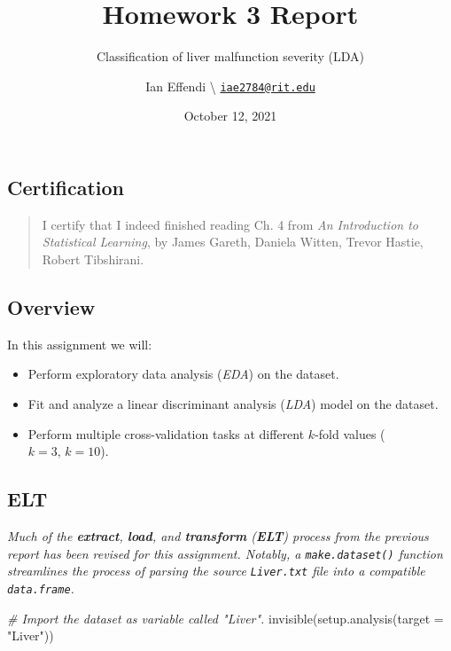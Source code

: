 \documentclass[
  11pt,
  a4paper,
]{scrartcl}
\title{Homework 3 Report}
\subtitle{Classification of liver malfunction severity (LDA)}
\author{Ian Effendi \textbackslash{}
\href{mailto:iae2784@rit.edu}{\nolinkurl{iae2784@rit.edu}}}
\date{October 12, 2021}
\newenvironment{Shaded}{\begin{snugshade}}{\end{snugshade}}
\newcommand{\AttributeTok}[1]{\textcolor[rgb]{0.77,0.63,0.00}{#1}}
\newcommand{\CommentTok}[1]{\textcolor[rgb]{0.56,0.35,0.01}{\textit{#1}}}
\newcommand{\FunctionTok}[1]{\textcolor[rgb]{0.00,0.00,0.00}{#1}}
\newcommand{\NormalTok}[1]{#1}
\newcommand{\StringTok}[1]{\textcolor[rgb]{0.31,0.60,0.02}{#1}}
\providecommand{\tightlist}{%
  \setlength{\itemsep}{0pt}\setlength{\parskip}{0pt}}
\begin{document}
\maketitle

{
\hypersetup{linkcolor=blue}
\setcounter{tocdepth}{3}
\tableofcontents
}
\hypertarget{certification}{%
\subsection{Certification}\label{certification}}

\begin{quote}
I certify that I indeed finished reading Ch. 4 from \emph{An
Introduction to Statistical Learning}, by James Gareth, Daniela Witten,
Trevor Hastie, Robert Tibshirani.
\end{quote}

\hypertarget{overview}{%
\subsection{Overview}\label{overview}}

In this assignment we will:

\begin{itemize}
\tightlist
\item
  Perform exploratory data analysis (\emph{EDA}) on the dataset.
\item
  Fit and analyze a linear discriminant analysis (\emph{LDA}) model on
  the dataset.
\item
  Perform multiple cross-validation tasks at different \(k\)-fold values
  (\(k=3,\,k=10\)).
\end{itemize}

\hypertarget{elt}{%
\subsection{ELT}\label{elt}}

\emph{Much of the \textbf{extract}, \textbf{load}, and
\textbf{transform} (\textbf{ELT}) process from the previous report has
been revised for this assignment. Notably, a \texttt{make.dataset()}
function streamlines the process of parsing the source
\texttt{Liver.txt} file into a compatible \texttt{data.frame}.}

\begin{Shaded}
\begin{Highlighting}[]
\CommentTok{\# Import the dataset as variable called "Liver".}
\FunctionTok{invisible}\NormalTok{(}\FunctionTok{setup.analysis}\NormalTok{(}\AttributeTok{target =} \StringTok{"Liver"}\NormalTok{))}
\end{Highlighting}
\end{Shaded}
\end{document}
